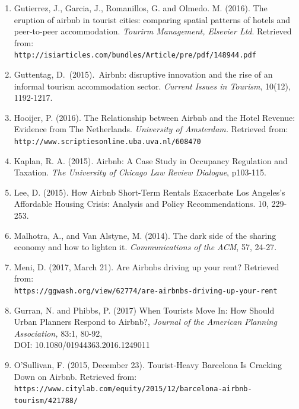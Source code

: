 \documentclass[10pt,letterpaper,onecolumn]{article}
\begin{document}
\begin{enumerate}
\item Gutierrez, J., Garcia, J., Romanillos, G. and Olmedo. M. (2016). The eruption of airbnb in tourist cities: comparing spatial patterns of
hotels and peer-to-peer accommodation. \emph{Tourirm Management, Elsevier Ltd}. Retrieved from:
\\\texttt{http://isiarticles.com/bundles/Article/pre/pdf/148944.pdf}

\item Guttentag, D.\ (2015).\ Airbnb: disruptive innovation and the rise of an informal tourism accommodation sector. \emph{Current Issues in Tourism}, 10(12), 1192-1217.

\item Hooijer, P. (2016). The Relationship between Airbnb and the Hotel Revenue: Evidence from The Netherlands. \emph{University of Amsterdam.} Retrieved from:
  \\\texttt{http://www.scriptiesonline.uba.uva.nl/608470}

\item Kaplan, R. A. (2015). Airbnb: A Case Study in Occupancy Regulation and
Taxation. \emph{The University of Chicago Law Review Dialogue}, p103-115.

\item Lee, D. (2015). How Airbnb Short-Term Rentals Exacerbate Los Angeles's
Affordable Housing Crisis: Analysis and Policy Recommendations. 10, 229-253.

\item Malhotra, A., and Van Alstyne, M. (2014). The dark side of the sharing
economy and how to lighten it. \emph{Communications of the ACM}, 57, 24-27.

\item Meni, D. (2017, March 21). Are Airbnbs driving up your rent? Retrieved
from:
\\\texttt{https://ggwash.org/view/62774/are-airbnbs-driving-up-your-rent}

\item Gurran, N. and Phibbs, P. (2017) When Tourists Move In: How Should Urban
Planners Respond to Airbnb?, \emph{Journal of the American Planning Association,}
83:1, 80-92,\\DOI: 10.1080/01944363.2016.1249011

\item O'Sullivan, F. (2015, December 23). Tourist-Heavy Barcelona Is Cracking
Down on Airbnb. Retrieved from:
\\\texttt{https://www.citylab.com/equity/2015/12/barcelona-airbnb-tourism/421788/}


\end{enumerate}
\end{document}
